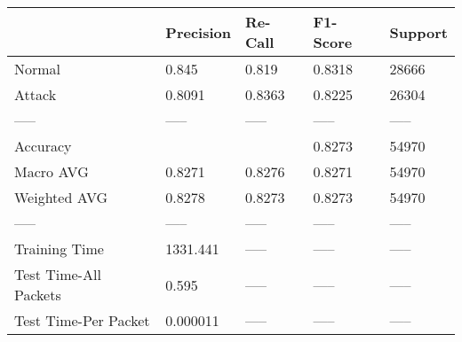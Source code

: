 \begin{tabular}{lllll}
\toprule
{} & Precision & Re-Call & F1-Score & Support \\
\midrule
Normal                &     0.845 &   0.819 &   0.8318 &   28666 \\
Attack                &    0.8091 &  0.8363 &   0.8225 &   26304 \\
-----                 &     ----- &   ----- &    ----- &   ----- \\
Accuracy              &           &         &   0.8273 &   54970 \\
Macro AVG             &    0.8271 &  0.8276 &   0.8271 &   54970 \\
Weighted AVG          &    0.8278 &  0.8273 &   0.8273 &   54970 \\
-----                 &     ----- &   ----- &    ----- &   ----- \\
Training Time         &  1331.441 &   ----- &    ----- &   ----- \\
Test Time-All Packets &     0.595 &   ----- &    ----- &   ----- \\
Test Time-Per Packet  &  0.000011 &   ----- &    ----- &   ----- \\
\bottomrule
\end{tabular}
